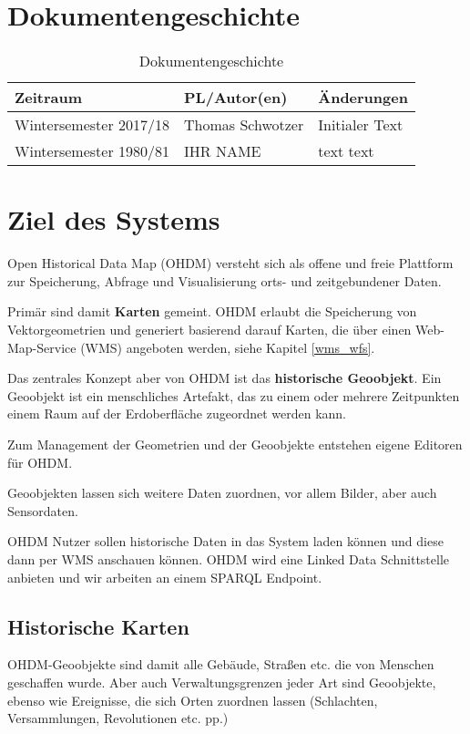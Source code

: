 \section{Dokumentengeschichte}
\begin{table}[h]
 \begin{tabular}{|l|l|p{4cm}|}
 \hline
 Zeitraum & PL/Autor(en) & Änderungen \\
 \hline
 Wintersemester 2017/18 & Thomas Schwotzer & 
 Initialer Text
 
  \\
 \hline
 Wintersemester 1980/81 & IHR NAME & 
text \newline 
text \newline 
 
  \\
 \hline
 
 
 \end{tabular}
 \caption{Dokumentengeschichte}
 \end{table}

\section{Ziel des Systems}
Open Historical Data Map (OHDM) versteht sich als offene und freie Plattform zur Speicherung, 
Abfrage und Visualisierung orts- und zeitgebundener Daten.

Primär sind damit {\bf Karten} gemeint. OHDM erlaubt die Speicherung von Vektorgeometrien
und generiert basierend darauf Karten, die über einen Web-Map-Service (WMS) angeboten werden,
siehe Kapitel \ref{wms_wfs}.

Das zentrales Konzept aber von OHDM ist das {\bf historische Geoobjekt}. Ein Geoobjekt
ist ein menschliches Artefakt, das zu einem oder mehrere Zeitpunkten einem Raum auf der
Erdoberfläche zugeordnet werden kann. 

Zum Management der Geometrien und der Geoobjekte entstehen eigene Editoren für OHDM.

Geoobjekten lassen sich weitere Daten zuordnen, vor allem Bilder, aber auch Sensordaten. 

OHDM Nutzer sollen historische Daten in das System laden können und diese dann per WMS 
anschauen können. OHDM wird eine Linked Data Schnittstelle anbieten und wir arbeiten an einem
SPARQL Endpoint.

\subsection{Historische Karten}
OHDM-Geoobjekte sind damit alle Gebäude, Straßen etc. die von Menschen geschaffen wurde.
Aber auch Verwaltungsgrenzen jeder Art sind Geoobjekte, ebenso wie Ereignisse, die sich 
Orten zuordnen lassen (Schlachten, Versammlungen, Revolutionen etc. pp.)

